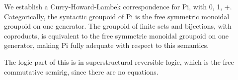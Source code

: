 We establish a Curry-Howard-Lambek correspondence for Pi, with 0, 1, +. Categorically, the syntactic groupoid of Pi is
the free symmetric monoidal groupoid on one generator. The groupoid of finite sets and bijections, with coproducts, is
equivalent to the free symmetric monoidal groupoid on one generator, making Pi fully adequate with respect to this
semantics.

The logic part of this is in superstructural reversible logic, which is the free commutative semirig, since there are no
equations.

